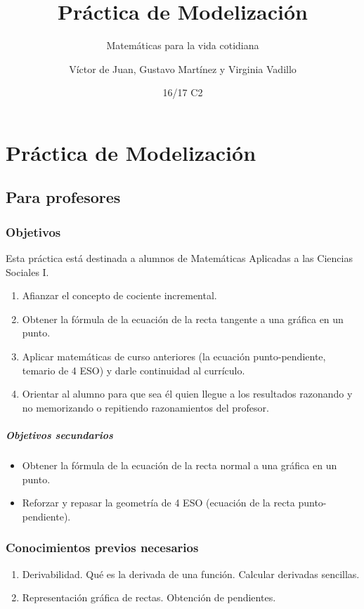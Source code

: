 \documentclass[palatino]{apuntesURJC}
\title{Práctica de Modelización}
\subtitle{Matemáticas para la vida cotidiana}
\author{Víctor de Juan, Gustavo Martínez y Virginia Vadillo}
\date{16/17 C2}
\begin{document}
\maketitle

\chapter{Práctica de Modelización}

\section{Para profesores}
\subsection{Objetivos}

Esta práctica está destinada a alumnos de Matemáticas Aplicadas a las Ciencias Sociales I.

\begin{enumerate}
	\item Afianzar el concepto de cociente incremental.
	\item Obtener la fórmula de la ecuación de la recta tangente a una gráfica en un punto.
	\item Aplicar matemáticas de curso anteriores (la ecuación punto-pendiente, temario de 4 ESO) y darle continuidad al currículo.
	\item Orientar al alumno para que sea él quien llegue a los resultados razonando y no memorizando o repitiendo razonamientos del profesor.
\end{enumerate}

\paragraph{Objetivos secundarios}
\begin{itemize}
	\item Obtener la fórmula de la ecuación de la recta normal a una gráfica en un punto.
	\item Reforzar y repasar la geometría de 4 ESO (ecuación de la recta punto-pendiente).
\end{itemize}


\subsection{Conocimientos previos necesarios}
\begin{enumerate}
	\item Derivabilidad. Qué es la derivada de una función. Calcular derivadas sencillas.
	\item Representación gráfica de rectas. Obtención de pendientes.
\end{enumerate}
\end{document}
